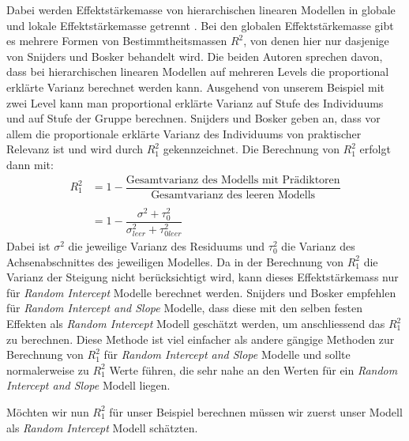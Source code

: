\documentclass[12pt]{article}\usepackage[]{graphicx}\usepackage[]{color}
\begin{document}
Dabei werden Effektstärkemasse von hierarchischen linearen Modellen in globale und lokale Effektstärkemasse getrennt \citep{PEUGH201085}. Bei den globalen Effektstärkemasse gibt es mehrere Formen von Bestimmtheitsmassen $R^2$, von denen hier nur dasjenige von Snijders und Bosker \citeyearpar{SnijdersTomA.B2012Ma:a} behandelt wird. Die beiden Autoren sprechen davon, dass bei hierarchischen linearen Modellen auf mehreren Levels die proportional erklärte Varianz berechnet werden kann. Ausgehend von unserem Beispiel mit zwei Level kann man proportional erklärte Varianz auf Stufe des Individuums und auf Stufe der Gruppe berechnen. Snijders und Bosker \citeyearpar{SnijdersTomA.B2012Ma:a} geben an, dass vor allem die proportionale erklärte Varianz des Individuums von praktischer Relevanz ist und wird durch $R_{1}^2$ gekennzeichnet. Die Berechnung von $R_{1}^2$ erfolgt dann mit:
\begin{equation} 
\begin{split}	
 R_{1}^2 & = 1 - \dfrac{\text{Gesamtvarianz des Modells mit Prädiktoren}}{\text{Gesamtvarianz des leeren Modells}} \\
 & \\
 & = 1 - \dfrac{\sigma^2 + \tau_{0}^2}{\sigma_{leer}^2 + \tau_{0leer}^2}
\end{split}	
\end{equation}
Dabei ist $\sigma^2$ die jeweilige Varianz des Residuums und $\tau_{0}^2$ die Varianz des Achsenabschnittes des jeweiligen Modelles. Da in der Berechnung von $R_{1}^2$ die Varianz der Steigung nicht berücksichtigt wird, kann dieses Effektstärkemass nur für \textit{Random Intercept} Modelle berechnet werden. Snijders und Bosker \citeyearpar{SnijdersTomA.B2012Ma:a} empfehlen für \textit{Random Intercept and Slope} Modelle, dass diese mit den selben festen Effekten als \textit{Random Intercept} Modell geschätzt werden, um anschliessend das $R_{1}^2$ zu berechnen. Diese Methode ist viel einfacher als andere gängige Methoden zur Berechnung von $R_{1}^2$ für \textit{Random Intercept and Slope} Modelle und sollte normalerweise zu $R_{1}^2$ Werte führen, die sehr nahe an den Werten für ein \textit{Random Intercept and Slope} Modell liegen.

Möchten wir nun $R_{1}^2$ für unser Beispiel berechnen müssen wir zuerst unser Modell als \textit{Random Intercept} Modell schätzten.
\end{document}

